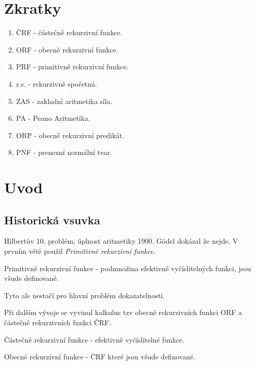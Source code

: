 \section{\texorpdfstring{Zkratky}{Zkratky}}
\vspace{5mm}
\large

\begin{enumerate}
	\item ČRF - částečně rekurzivní funkce.
	\item ORF - obecně rekurzivní funkce.
	\item PRF - primitivně rekurzivní funkce.
	\item r.s. - rekurzivně spočetná.
	\item ZAS - zakladní aritmetika síla.
	\item PA - Peano Aritmetika.
	\item ORP - obecně rekurzivní predikát.
	\item PNF - prenexní normální tvar.
\end{enumerate}

\section{\texorpdfstring{Uvod}{Uvod}}
\vspace{5mm}
\large


\subsection{Historická vsuvka}

Hilbertův 10. problém, úplnost aritmetiky 1900.
G\"{o}del dokázal že nejde. V prvním větě použil \emph{Primitivně rekurzivní funkce}.

\begin{definition}
	Primitivně rekurzivní funkce - podmnožina efektivně vyčíslitelných funkci, jsou všude definované.
\end{definition}

Tyto ale nestačí pro hlavní problém dokazatelnosti.

Při dalším vývoje se vyvinul kalkulus tzv obecně rekurzivních funkci ORF a částečně rekurzivních funkci ČRF.

\begin{definition}
	Částečně rekurzivní funkce - efektivně vyčíslitelné funkce.
\end{definition}

\begin{definition}
	Obecné rekurzivní funkce - ČRF které jsou všude definované.
\end{definition}

